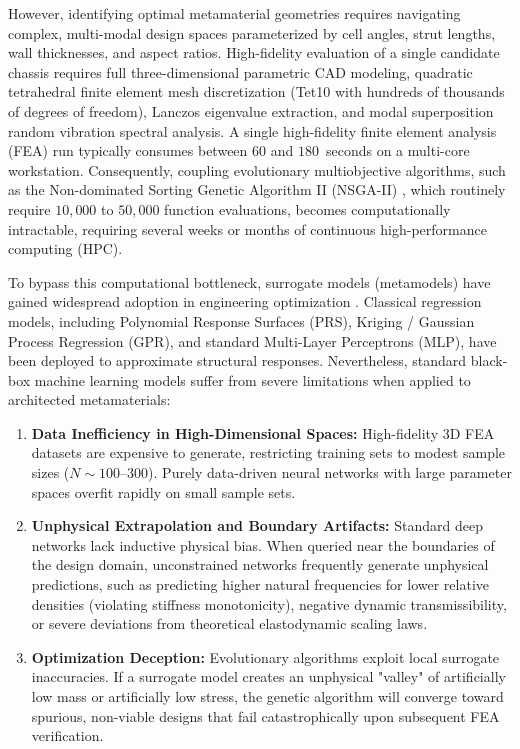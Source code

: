 \documentclass[preprint,12pt,3p]{elsarticle}
\begin{document}
However, identifying optimal metamaterial geometries requires navigating complex, multi-modal design spaces parameterized by cell angles, strut lengths, wall thicknesses, and aspect ratios. High-fidelity evaluation of a single candidate chassis requires full three-dimensional parametric CAD modeling, quadratic tetrahedral finite element mesh discretization (Tet10 with hundreds of thousands of degrees of freedom), Lanczos eigenvalue extraction, and modal superposition random vibration spectral analysis. A single high-fidelity finite element analysis (FEA) run typically consumes between $60$ and $180$~seconds on a multi-core workstation. Consequently, coupling evolutionary multiobjective algorithms, such as the Non-dominated Sorting Genetic Algorithm II (NSGA-II) \cite{deb2002}, which routinely require $10,000$ to $50,000$ function evaluations, becomes computationally intractable, requiring several weeks or months of continuous high-performance computing (HPC).

To bypass this computational bottleneck, surrogate models (metamodels) have gained widespread adoption in engineering optimization \cite{zheng2024}. Classical regression models, including Polynomial Response Surfaces (PRS), Kriging / Gaussian Process Regression (GPR), and standard Multi-Layer Perceptrons (MLP), have been deployed to approximate structural responses. Nevertheless, standard black-box machine learning models suffer from severe limitations when applied to architected metamaterials:
\begin{enumerate}
  \item \textbf{Data Inefficiency in High-Dimensional Spaces:} High-fidelity 3D FEA datasets are expensive to generate, restricting training sets to modest sample sizes ($N \sim 100\text{--}300$). Purely data-driven neural networks with large parameter spaces overfit rapidly on small sample sets.
  \item \textbf{Unphysical Extrapolation and Boundary Artifacts:} Standard deep networks lack inductive physical bias. When queried near the boundaries of the design domain, unconstrained networks frequently generate unphysical predictions, such as predicting higher natural frequencies for lower relative densities (violating stiffness monotonicity), negative dynamic transmissibility, or severe deviations from theoretical elastodynamic scaling laws.
  \item \textbf{Optimization Deception:} Evolutionary algorithms exploit local surrogate inaccuracies. If a surrogate model creates an unphysical "valley" of artificially low mass or artificially low stress, the genetic algorithm will converge toward spurious, non-viable designs that fail catastrophically upon subsequent FEA verification.
\end{enumerate}
\end{document}
